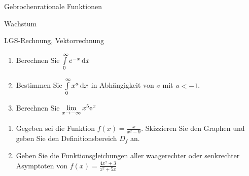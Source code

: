 


\begin{inhalt}
  \item Gebrochenrationale Funktionen
	\item Wachstum
	\item LGS-Rechnung, Vektorrechnung
\end{inhalt}

\begin{enumerate}
	\item Berechnen Sie $\int\limits^\infty_0 e^{-x}\,\mathrm{d} x$
	\item	Bestimmen Sie $\int\limits^\infty_0 x^a\,\mathrm{d} x$ in Abhängigkeit von $a$ mit $a < -1$.
	\item Berechnen Sie $\lim\limits_{x\rightarrow -\infty} x^5\mathrm{e}^x$
\end{enumerate}

\begin{enumerate}
	\item Gegeben sei die Funktion $f(x)=\frac{x}{x^2-9}$. Skizzieren Sie den Graphen und geben Sie den Definitionsbereich $D_f$ an.
	\item	Geben Sie die Funktionsgleichungen aller waagerechter oder senkrechter Asymptoten von $f(x)=\frac{4x^2+3}{x^2+5x}$
\end{enumerate}

